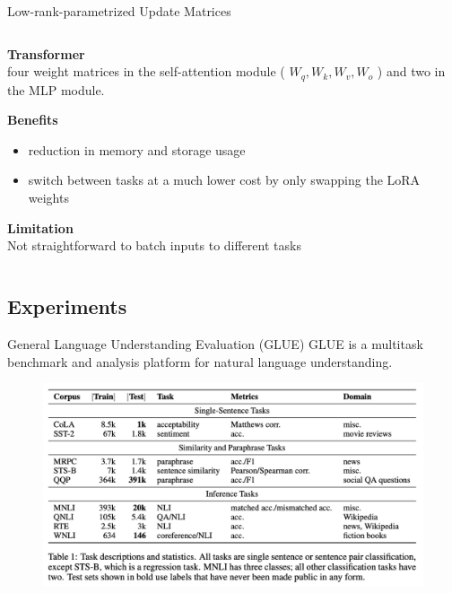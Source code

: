 \documentclass[aspectratio=169,xcolor=dvipsnames]{beamer}
\begin{document}
\begin{frame}{Low-rank-parametrized Update Matrices}
\begin{columns}
\begin{column}{0.7\textwidth}
             \textbf{Transformer} \\
            four weight matrices in the self-attention module ( $W_{q}, W_{k}, W_{v}, W_{o}$ ) and two in the MLP module. \\
            \bigskip
            
            \textbf{Benefits}\\
            \begin{itemize}
                \item reduction in memory and storage usage
                \item switch between tasks at a much lower cost by only swapping the LoRA weights
            \end{itemize}
            \bigskip    
            
            \textbf{Limitation}\\
            Not straightforward to batch inputs to different tasks
        \end{column}
    \end{columns}
\end{frame}



\subsection{Experiments}

\begin{frame}{General Language Understanding Evaluation (GLUE)}
    GLUE is a multitask benchmark and analysis platform for natural language understanding.
    \bigskip
    \begin{figure}
        \centering
        \label{GLUE}
        \includegraphics[width=0.8 \linewidth]{figures/GLUE.png}
    \end{figure} 
\end{frame}
\end{document}
